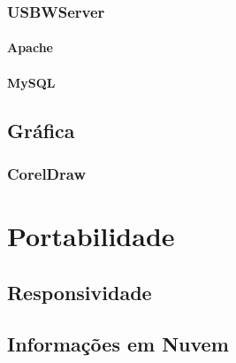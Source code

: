 \documentclass[12pt,a4paper]{book}
\begin{document}
\subsection{USBWServer}
\subsubsection{Apache}

\subsubsection{MySQL}

\section{Gráfica}
\subsection{CorelDraw}


\chapter{Portabilidade}

\section{Responsividade}


\section{Informações em Nuvem}






\printindex
\end{document}
